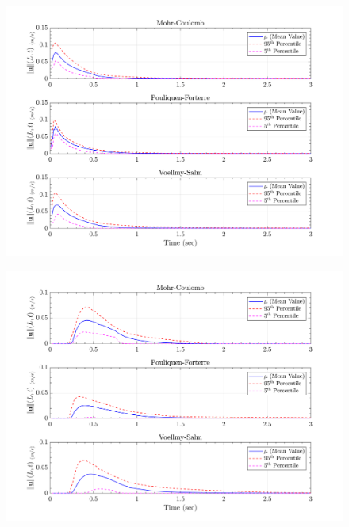\documentclass{article}
\begin{document}
\begin{figure}[H]
	\begin{minipage}[b]{0.5\linewidth}
    	\centering
    	\includegraphics[width=1\textwidth]{InclinedPlane/LocalRecords/Records/Vel_L1.png}
    	\label{fig:Ramp-L1-Vel}
	\end{minipage}
	\begin{minipage}[b]{0.5\linewidth}
		\centering
		\includegraphics[width=1\textwidth]{InclinedPlane/LocalRecords/Records/Vel_L8.png}
    	\label{fig:Ramp-L2-Vel}
    \end{minipage}


\end{figure}
\end{document}
